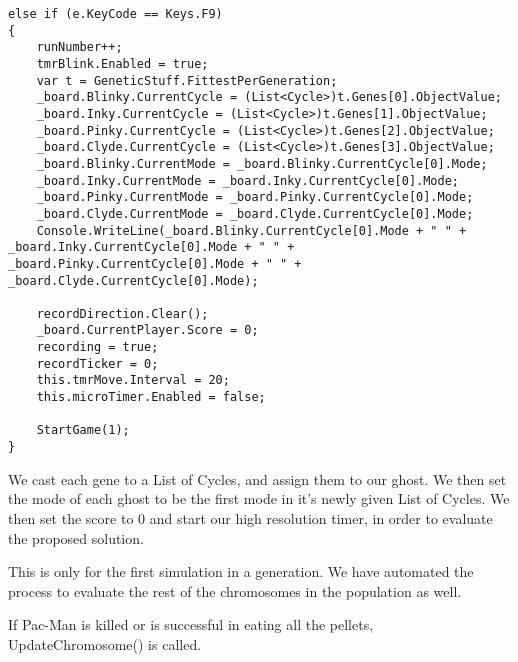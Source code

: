 \begin{lstlisting}[caption=Snippet of frmScreen.cs. Key event handler starting the simulation, label=lst:keyHandler]
else if (e.KeyCode == Keys.F9)
{
	runNumber++;
	tmrBlink.Enabled = true;
	var t = GeneticStuff.FittestPerGeneration;
	_board.Blinky.CurrentCycle = (List<Cycle>)t.Genes[0].ObjectValue;
	_board.Inky.CurrentCycle = (List<Cycle>)t.Genes[1].ObjectValue;
	_board.Pinky.CurrentCycle = (List<Cycle>)t.Genes[2].ObjectValue;
	_board.Clyde.CurrentCycle = (List<Cycle>)t.Genes[3].ObjectValue;
	_board.Blinky.CurrentMode = _board.Blinky.CurrentCycle[0].Mode;
	_board.Inky.CurrentMode = _board.Inky.CurrentCycle[0].Mode;
	_board.Pinky.CurrentMode = _board.Pinky.CurrentCycle[0].Mode;
	_board.Clyde.CurrentMode = _board.Clyde.CurrentCycle[0].Mode;
	Console.WriteLine(_board.Blinky.CurrentCycle[0].Mode + " " + _board.Inky.CurrentCycle[0].Mode + " " + _board.Pinky.CurrentCycle[0].Mode + " " + _board.Clyde.CurrentCycle[0].Mode);

	recordDirection.Clear();
	_board.CurrentPlayer.Score = 0;
	recording = true;
	recordTicker = 0;
	this.tmrMove.Interval = 20;
	this.microTimer.Enabled = false;

	StartGame(1);
}
\end{lstlisting}

We cast each gene to a List of Cycles, and assign them to our ghost. We then set the mode of each ghost to be the first mode in it’s newly given List of Cycles. We then set the score to 0 and start our high resolution timer, in order to evaluate the proposed solution.

This is only for the first simulation in a generation. We have automated the process to evaluate the rest of the chromosomes in the population as well.

If Pac-Man is killed or is successful in eating all the pellets, UpdateChromosome() is called.

